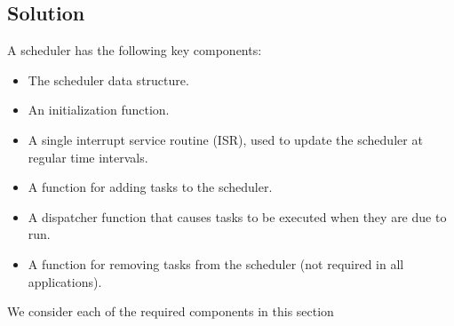 \subsection{Solution}
A scheduler has the following key components:
\begin{itemize}
    \item  The scheduler data structure.
    \item  An initialization function.
    \item  A single interrupt service routine (ISR), used to update the scheduler at regular time
    intervals.
    \item  A function for adding tasks to the scheduler.
    \item  A dispatcher function that causes tasks to be executed when they are due to run.
    \item  A function for removing tasks from the scheduler (not required in all applications).
\end{itemize}

We consider each of the required components in this section

